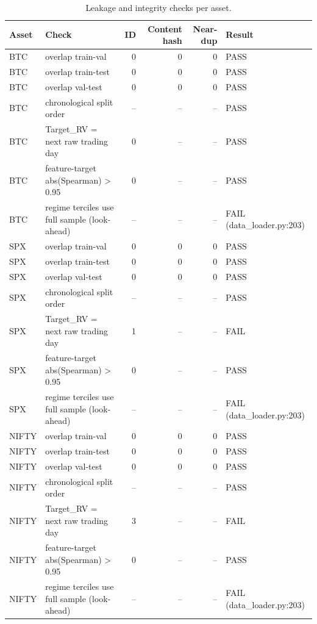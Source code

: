 \begin{table}[htbp]
\centering
\caption{Leakage and integrity checks per asset.}
\label{tab:t6_leakage_check}
\begin{tabular}{llrrrl}
\toprule
Asset & Check & ID & Content hash & Near-dup & Result \\
\midrule
BTC & overlap train-val & 0 & 0 & 0 & PASS \\
BTC & overlap train-test & 0 & 0 & 0 & PASS \\
BTC & overlap val-test & 0 & 0 & 0 & PASS \\
BTC & chronological split order & -- & -- & -- & PASS \\
BTC & Target\_RV = next raw trading day & 0 & -- & -- & PASS \\
BTC & feature-target abs(Spearman) > 0.95 & 0 & -- & -- & PASS \\
BTC & regime terciles use full sample (look-ahead) & -- & -- & -- & FAIL (data\_loader.py:203) \\
SPX & overlap train-val & 0 & 0 & 0 & PASS \\
SPX & overlap train-test & 0 & 0 & 0 & PASS \\
SPX & overlap val-test & 0 & 0 & 0 & PASS \\
SPX & chronological split order & -- & -- & -- & PASS \\
SPX & Target\_RV = next raw trading day & 1 & -- & -- & FAIL \\
SPX & feature-target abs(Spearman) > 0.95 & 0 & -- & -- & PASS \\
SPX & regime terciles use full sample (look-ahead) & -- & -- & -- & FAIL (data\_loader.py:203) \\
NIFTY & overlap train-val & 0 & 0 & 0 & PASS \\
NIFTY & overlap train-test & 0 & 0 & 0 & PASS \\
NIFTY & overlap val-test & 0 & 0 & 0 & PASS \\
NIFTY & chronological split order & -- & -- & -- & PASS \\
NIFTY & Target\_RV = next raw trading day & 3 & -- & -- & FAIL \\
NIFTY & feature-target abs(Spearman) > 0.95 & 0 & -- & -- & PASS \\
NIFTY & regime terciles use full sample (look-ahead) & -- & -- & -- & FAIL (data\_loader.py:203) \\
\bottomrule
\end{tabular}
\end{table}
